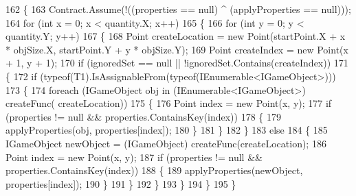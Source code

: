 \begin{DoxyCode}
162         \{
163             Contract.Assume(!((properties == null) ^ (applyProperties == null)));
164             \textcolor{keywordflow}{for} (\textcolor{keywordtype}{int} x = 0; x < quantity.X; x++)
165             \{
166                 \textcolor{keywordflow}{for} (\textcolor{keywordtype}{int} y = 0; y < quantity.Y; y++)
167                 \{
168                     Point createLocation = \textcolor{keyword}{new} Point(startPoint.X + x * objSize.X, startPoint.Y + y * 
      objSize.Y);
169                     Point createIndex = \textcolor{keyword}{new} Point(x + 1, y + 1);
170                     \textcolor{keywordflow}{if} (ignoredSet == null || !ignoredSet.Contains(createIndex))
171                     \{
172                         \textcolor{keywordflow}{if} (typeof(T1).IsAssignableFrom(typeof(IEnumerable<IGameObject>)))
173                         \{
174                             \textcolor{keywordflow}{foreach} (IGameObject obj \textcolor{keywordflow}{in} (IEnumerable<IGameObject>) createFunc(
      createLocation))
175                             \{
176                                 Point index = \textcolor{keyword}{new} Point(x, y);
177                                 \textcolor{keywordflow}{if} (properties != null && properties.ContainsKey(index))
178                                 \{
179                                     applyProperties(obj, properties[index]);
180                                 \}
181                             \}
182                         \}
183                         \textcolor{keywordflow}{else}
184                         \{
185                             IGameObject newObject = (IGameObject) createFunc(createLocation);
186                             Point index = \textcolor{keyword}{new} Point(x, y);
187                             \textcolor{keywordflow}{if} (properties != null && properties.ContainsKey(index))
188                             \{
189                                 applyProperties(newObject, properties[index]);
190                             \}
191                         \}
192                     \}
193                 \}
194             \}
195         \}
\end{DoxyCode}
\mbox{\label{classMelloMario_1_1LevelGen_1_1JsonConverters_1_1Util_a9e3f77ccbc1f2084f0e153ec682cebc8}} 
